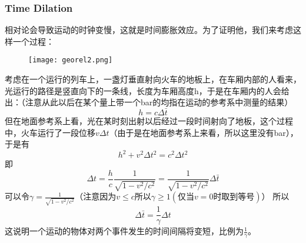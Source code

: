 \documentclass[14pt,oneside]{book}
\begin{document}
\begin{large}
\subsubsection{Time Dilation}
相对论会导致运动的时钟变慢，这就是时间膨胀效应。为了证明他，我们来考虑这样一个过程：
\begin{figure}[H]
\centering
  \texttt{[image: georel2.png]}
\end{figure}
考虑在一个运行的列车上，一盏灯垂直射向火车的地板上，在车厢内部的人看来，光运行的路径是竖直向下的一条线，长度为车厢高度h，于是在车厢内的人会给出：（注意从此以后在某个量上带一个bar的均指在运动的参考系中测量的结果）
\begin{equation}
  h=c\Delta\bar{t}
\end{equation}
但在地面参考系上看，光在某时刻出射以后经过一段时间射向了地板，这个过程中，火车运行了一段位移$v\Delta t$（由于是在地面参考系上来看，所以这里没有bar），于是有
\begin{equation}
  h^2+v^2\Delta t^2=c^2\Delta t^2
\end{equation}
即
\begin{equation}
  \Delta t=\frac{h}{c}\frac{1}{\sqrt{1-v^2/c^2}}=\frac{1}{\sqrt{1-v^2/c^2}}\Delta \bar t
\end{equation}
可以令$\gamma=\frac{1}{\sqrt{1-v^2/c^2}}$（注意因为$v\leq c$所以$\gamma\geq 1(\text{仅当}v=0\text{时取到等号})$）
所以
\begin{equation}
  \Delta \bar t=\frac{1}{\gamma}\Delta t
\end{equation}
这说明一个运动的物体对两个事件发生的时间间隔将变短，比例为$\frac{1}{\gamma}$。


\end{large}
\end{document}
